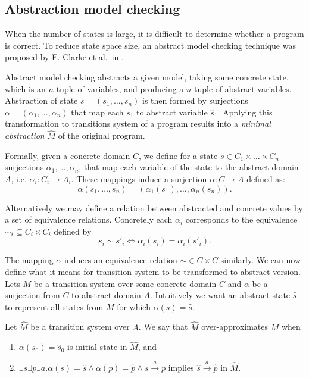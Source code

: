 \subsection{Abstraction model checking} \label{subsec:amc}

When the number of states is large, it is difficult to determine whether a program
is correct. To reduce state space size, an abstract model checking technique was proposed
by E. Clarke et al.~in \cite{Clarke94}.

Abstract model checking abstracts a given model, taking some concrete state,
which is an $n$-tuple of variables, and producing a $n$-tuple of abstract
variables. Abstraction of state $s = (s_1,\dots,s_n)$ is then formed by surjections
$\alpha = (\alpha_1,\dots,\alpha_n)$ that map each $s_1$ to abstract variable $\widehat{s}_1$.
Applying this transformation to transitions system of a program
results into a \emph{minimal abstraction} $\widehat{M}$ of the original program.

Formally, given a concrete domain $C$, we define for a state $s \in C_1 \times \dots \times C_n$
surjections $\alpha_1,\dots,\alpha_n$, that map each variable of the state to the abstract domain
$A$, i.e. $\alpha_i : C_i \rightarrow A_i$. These mappings induce
a surjection $\alpha: C \rightarrow A$ defined as:
\[\alpha(s_1,\dots, s_n) = (\alpha_1(s_1), \dots , \alpha_n(s_n)).\]

\noindent
Alternatively we may define a relation between abstracted and concrete values by
a set of equivalence relations. Concretely each $\alpha_i$ corresponds to the
equivalence ${\sim}_i \subseteq C_i \times C_i$ defined by
$$s_i  \sim s'_i \iff \alpha_i(s_i) = \alpha_i(s'_i).$$

The mapping $\alpha$ induces an equivalence relation $\sim \in C \times C$ similarly.
We can now define what it means for transition system to be transformed to
abstract version. Lets $M$ be a transition system over some concrete domain $C$ and
$\alpha$ be a surjection from $C$ to abstract domain $A$. Intuitively we want an
abstract state $\widehat{s}$ to represent all states from $M$ for which $\alpha(s) =
\widehat{s}$.

\begin{definition}\label{def:am}
    Let $\widehat{M}$ be a transition system over $A$. We say that $\widehat{M}$
    over-approximates $M$ when
    \begin{enumerate}
        \item $\alpha(s_0) = \widehat{s}_0$ is initial state in $\widehat{M}$, and
        \item $\exists s \exists p \exists a . \alpha(s) = \widehat{s} \wedge \alpha(p) = \widehat{p} \wedge s
               \xrightarrow[]{a} p$ implies $\widehat{s}
               \xrightarrow[]{a} \widehat{p}$ in $\widehat{M}$.
    \end{enumerate}
\end{definition}

